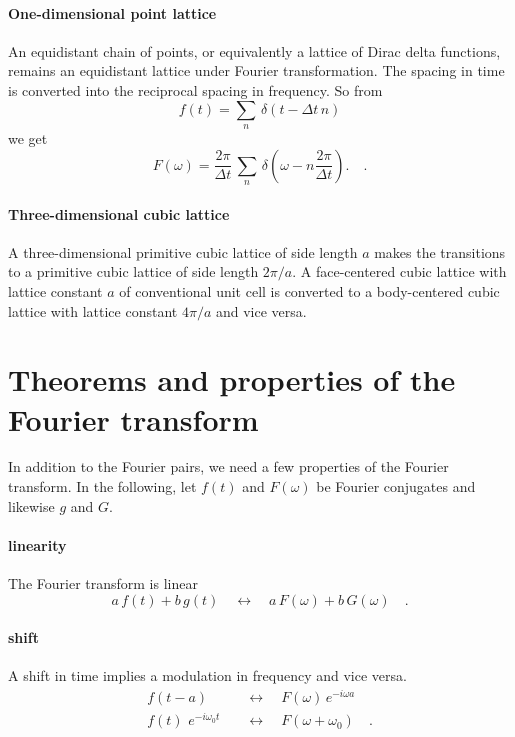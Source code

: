 \paragraph{One-dimensional point lattice} An equidistant chain of points, or equivalently a lattice of Dirac delta functions, remains an equidistant lattice under Fourier transformation. The spacing in time is converted into the reciprocal spacing in frequency. So from
\begin{equation}
 f(t) = \sum_n \, \delta (t - \Delta t \, n)
\end{equation}
we get
\begin{equation}
 F(\omega) = \frac{2 \pi}{\Delta t} \, \sum_n \, \delta \left(\omega - n\frac{2 \pi}{\Delta t} \right). \quad .
\end{equation}


\paragraph{Three-dimensional cubic lattice} A three-dimensional primitive cubic lattice of side length $a$ makes the transitions to a primitive cubic lattice of side length $2 \pi/a$. A face-centered cubic lattice with lattice constant $a$ of conventional unit cell is converted  to a body-centered cubic lattice with lattice constant $4 \pi / a$ and vice versa. 


\section{Theorems and properties of the Fourier transform}

In addition to the Fourier pairs, we need a few properties of the Fourier transform. In the following, let $f(t)$ and $F(\omega)$ be Fourier conjugates and likewise $g$ and $G$.

\paragraph{linearity} The Fourier transform is linear
\begin{equation}
a \, f(t) + b \, g(t) \quad \leftrightarrow \quad 
a \, F(\omega) + b \, G(\omega)  \quad .
\end{equation}

\paragraph{shift} A shift in time implies a modulation in frequency and vice versa.
\begin{align}
 f(t - a) & \quad \leftrightarrow \quad 
F(\omega) \, e^{-i \omega a} \\
 f(t) \, \, e^{-i \omega_0 t} & \quad \leftrightarrow \quad 
F(\omega + \omega_0)   \quad .
\end{align}

